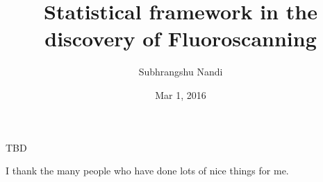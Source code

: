 

\clearpage{}  %


\title{Statistical framework in the discovery of Fluoroscanning}
\author{Subhrangshu Nandi}
\date{Mar 1, 2016}
\prelim
\maketitle

\copyrightpage

\begin{dedication}
TBD
\end{dedication}

\begin{acknowledgments}
I thank the many people who have done lots of nice things for me.
\end{acknowledgments}

\tableofcontents
\listoftables
\listoffigures

